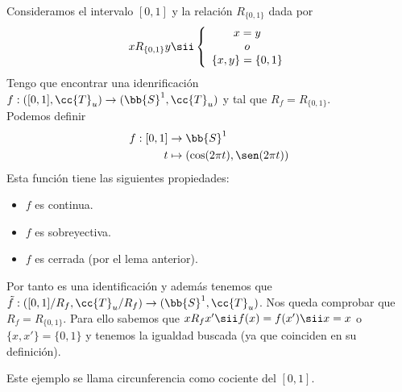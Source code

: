 \begin{ejemplo}
    Consideramos el intervalo $[0,1]$ y la relación $R_{\{0,1\}}$ dada por 
    \begin{align*}
        xR_{\{0,1\}} y \sii \left\{
        \begin{array}{c}
            x=y\\
            o\\
            \{x,y\}=\{0,1\}
        \end{array}
        \right.
    \end{align*}
    Tengo que encontrar una idenrificación $f:([0,1], \cc{T}_u)\to (\bb{S}^1, \cc{T}_u)$ y tal que $R_f=R_{\{0,1\}}$.\\

    Podemos definir
    \begin{align*}
        f:[0,1]&\to \bb{S}^1\\
        t &\mapsto (\cos(2\pi t), \sen (2\pi t))
    \end{align*}
    Esta función tiene las siguientes propiedades:
    \begin{itemize}
        \item $f$ es continua.
        \item $f$ es sobreyectiva.
        \item $f$ es cerrada (por el lema anterior).
    \end{itemize}
    Por tanto es una identificación y además tenemos que $\tilde{f}:([0,1]/R_f, \cc{T}_u/R_f)\to (\bb{S}^1, \cc{T}_u)$. Nos queda comprobar que $R_f=R_{\{0,1\}}$. Para ello sabemos que $xR_fx' \sii f(x)=f(x')\sii x=x$ o $\{x,x'\}=\{0,1\}$ y tenemos la igualdad buscada (ya que coinciden en su definición). 

    Este ejemplo se llama circunferencia como cociente del $[0,1]$.
    \endsquare
\end{ejemplo}

